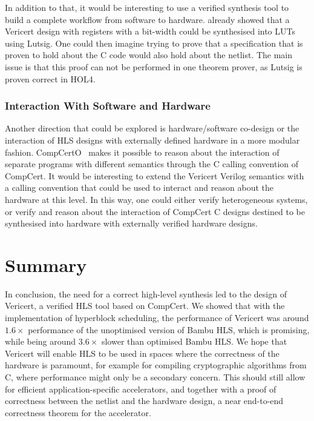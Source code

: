 In addition to that, it would be interesting to use a verified synthesis tool to
build a complete workflow from software to hardware.  \textcite{lööw21_lutsig}
already showed that a Vericert design with registers with a bit-width could be
synthesised into \glspl{LUT} using Lutsig.  One could then imagine trying to
prove that a specification that is proven to hold about the C code would also
hold about the netlist.  The main issue is that this proof can not be performed
in one theorem prover, as Lutsig is proven correct in HOL4.

\subsubsection{Interaction With Software and Hardware}

Another direction that could be explored is hardware/software co-design or the
interaction of \gls{HLS} designs with externally defined hardware in a more
modular fashion.  CompCertO~\cite{koenig21_compc} makes it possible to reason
about the interaction of separate programs with different semantics through the
C calling convention of CompCert.  It would be interesting to extend the
Vericert Verilog semantics with a calling convention that could be used to
interact and reason about the hardware at this level.  In this way, one could
either verify heterogeneous systems, or verify and reason about the interaction
of CompCert C designs destined to be synthesised into hardware with externally
verified hardware designs.

\section{Summary}

In conclusion, the need for a correct high-level synthesis led to the design of
Vericert, a verified \gls{HLS} tool based on CompCert.  We showed that with the
implementation of hyperblock scheduling, the performance of Vericert was around
$1.6\times$ performance of the unoptimised version of Bambu HLS, which is
promising, while being around $3.6\times$ slower than optimised Bambu HLS.  We
hope that Vericert will enable \gls{HLS} to be used in spaces where the
correctness of the hardware is paramount, for example for compiling
cryptographic algorithms from C, where performance might only be a secondary
concern.  This should still allow for efficient application-specific
accelerators, and together with a proof of correctness between the netlist and
the hardware design, a near end-to-end correctness theorem for the accelerator.

